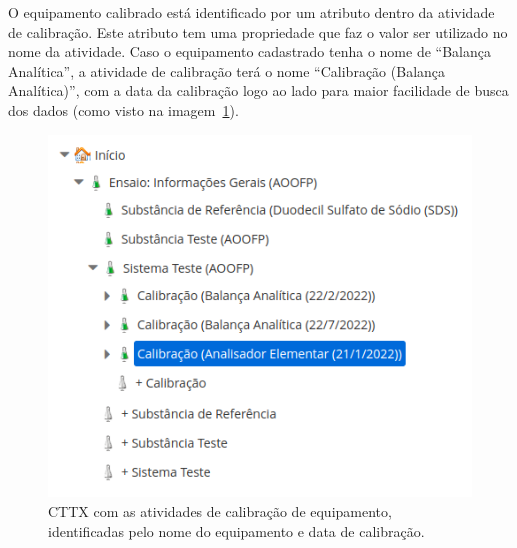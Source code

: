 O equipamento calibrado está identificado por um atributo dentro da atividade de calibração. Este atributo tem uma propriedade que faz o valor ser utilizado no nome da atividade. Caso o equipamento cadastrado tenha o nome de ``Balança Analítica'', a atividade de calibração terá o nome ``Calibração (Balança Analítica)'', com a data da calibração logo ao lado para maior facilidade de busca dos dados (como visto na imagem~\ref{fig:cttx_eqp_calibration}).

\begin{figure}
    \centering
    \includegraphics[width=.5\textwidth]{imgs/CTTX-EQP/calibration_tree.png}
    \caption{CTTX com as atividades de calibração de equipamento, identificadas pelo nome do equipamento e data de calibração.}
    \label{fig:cttx_eqp_calibration}
\end{figure}